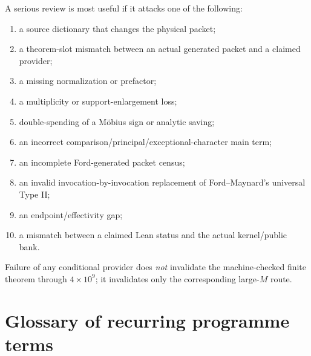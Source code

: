 \documentclass[11pt]{article}
\theoremstyle{definition}
\newcommand{\1}{\mathbf 1}
\begin{document}
{{{A serious review is most useful if it attacks one of the following:
\begin{enumerate}[leftmargin=2.0em]
\item a source dictionary that changes the physical packet;
\item a theorem-slot mismatch between an actual generated packet and a claimed provider;
\item a missing normalization or prefactor;
\item a multiplicity or support-enlargement loss;
\item double-spending of a M\"obius sign or analytic saving;
\item an incorrect comparison/principal/exceptional-character main term;
\item an incomplete Ford-generated packet census;
\item an invalid invocation-by-invocation replacement of Ford--Maynard's universal Type II;
\item an endpoint/effectivity gap;
\item a mismatch between a claimed Lean status and the actual kernel/public bank.
\end{enumerate}
Failure of any conditional provider does \emph{not} invalidate the machine-checked finite
theorem through $4\times10^9$; it invalidates only the corresponding large-$M$ route.

\section{Glossary of recurring programme terms}
\label{sec:glossary}

}}}
\end{document}
